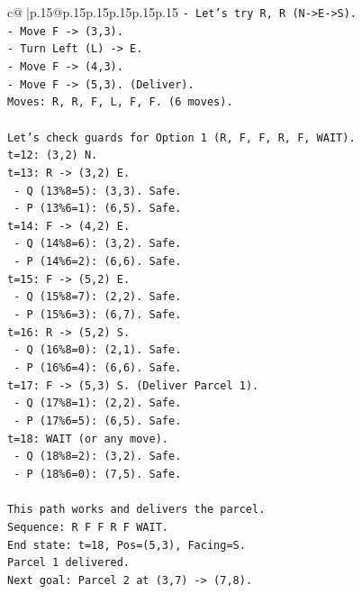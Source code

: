 \documentclass{article}
\begin{document}
{\begin{supertabular}{c@{$\;$}|p{.15\linewidth}@{}p{.15\linewidth}p{.15\linewidth}p{.15\linewidth}p{.15\linewidth}p{.15\linewidth}}
{{{\texttt{{-} Let's try R, R (N{-}>E{-}>S).} \\
\texttt{{-} Move F {-}> (3,3).} \\
\texttt{{-} Turn Left (L) {-}> E.} \\
\texttt{{-} Move F {-}> (4,3).} \\
\texttt{{-} Move F {-}> (5,3). (Deliver).} \\
\texttt{Moves: R, R, F, L, F, F. (6 moves).} \\
\\ 
\texttt{Let's check guards for Option 1 (R, F, F, R, F, WAIT).} \\
\texttt{t=12: (3,2) N.} \\
\texttt{t=13: R {-}> (3,2) E.} \\
\texttt{   {-} Q (13\%8=5): (3,3). Safe.} \\
\texttt{   {-} P (13\%6=1): (6,5). Safe.} \\
\texttt{t=14: F {-}> (4,2) E.} \\
\texttt{   {-} Q (14\%8=6): (3,2). Safe.} \\
\texttt{   {-} P (14\%6=2): (6,6). Safe.} \\
\texttt{t=15: F {-}> (5,2) E.} \\
\texttt{   {-} Q (15\%8=7): (2,2). Safe.} \\
\texttt{   {-} P (15\%6=3): (6,7). Safe.} \\
\texttt{t=16: R {-}> (5,2) S.} \\
\texttt{   {-} Q (16\%8=0): (2,1). Safe.} \\
\texttt{   {-} P (16\%6=4): (6,6). Safe.} \\
\texttt{t=17: F {-}> (5,3) S. (Deliver Parcel 1).} \\
\texttt{   {-} Q (17\%8=1): (2,2). Safe.} \\
\texttt{   {-} P (17\%6=5): (6,5). Safe.} \\
\texttt{t=18: WAIT (or any move).} \\
\texttt{   {-} Q (18\%8=2): (3,2). Safe.} \\
\texttt{   {-} P (18\%6=0): (7,5). Safe.} \\
\\ 
\texttt{This path works and delivers the parcel.} \\
\texttt{Sequence: R F F R F WAIT.} \\
\texttt{End state: t=18, Pos=(5,3), Facing=S.} \\
\texttt{Parcel 1 delivered.} \\
\texttt{Next goal: Parcel 2 at (3,7) {-}> (7,8).} \\
}}}
\end{supertabular}}
\end{document}
